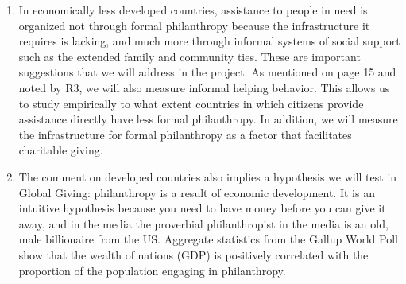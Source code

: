 \documentclass[twocolumn, serif, rga, numeric]{jote-article}
\begin{document}
\begin{enumerate}
\item In economically less developed countries, assistance to people in need is organized not through formal philanthropy because the infrastructure it requires is lacking, and much more through informal systems of social support such as the extended family and community ties. These are important suggestions that we will address in the project. As mentioned on page 15 and noted by R3, we will also measure informal helping behavior. This allows us to study empirically to what extent countries in which citizens provide assistance directly have less formal philanthropy. In addition, we will measure the infrastructure for formal philanthropy as a factor that facilitates charitable giving.
\item The comment on developed countries also implies a hypothesis we will test in Global Giving: philanthropy is a result of economic development. It is an intuitive hypothesis because you need to have money before you can give it away, and in the media the proverbial philanthropist in the media is an old, male billionaire from the US. Aggregate statistics from the Gallup World Poll show that the wealth of nations (GDP) is positively correlated with the proportion of the population engaging in philanthropy.
\end{enumerate}
\end{document}
